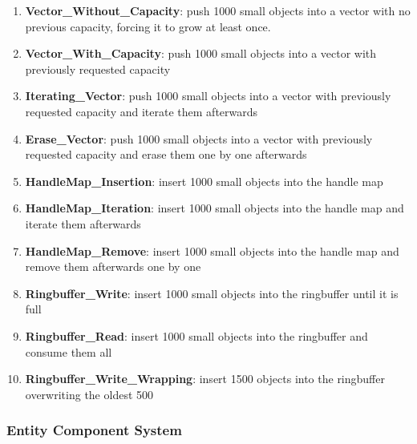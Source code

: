 \begin{enumerate}
	\item \textbf{Vector\_Without\_Capacity}: push 1000 small objects into a vector with no previous capacity, forcing it to grow at least once. 
	
	\item \textbf{Vector\_With\_Capacity}: push 1000 small objects into a vector with previously requested capacity
	
	\item \textbf{Iterating\_Vector}: push 1000 small objects into a vector with previously requested capacity and iterate them afterwards 

	\item \textbf{Erase\_Vector}: push 1000 small objects into a vector with previously requested capacity and erase them one by one afterwards
	
	\item \textbf{HandleMap\_Insertion}: insert 1000 small objects into the handle map
	
	\item \textbf{HandleMap\_Iteration}: insert 1000 small objects into the handle map and iterate them afterwards
	
	\item \textbf{HandleMap\_Remove}: insert 1000 small objects into the handle map and remove them afterwards one by one
	
	\item \textbf{Ringbuffer\_Write}: insert 1000 small objects into the ringbuffer until it is full

	\item \textbf{Ringbuffer\_Read}: insert 1000 small objects into the ringbuffer and consume them all
	
	\item \textbf{Ringbuffer\_Write\_Wrapping}: insert 1500 objects into the ringbuffer overwriting the oldest 500	
\end{enumerate}

\subsubsection{Entity Component System}

